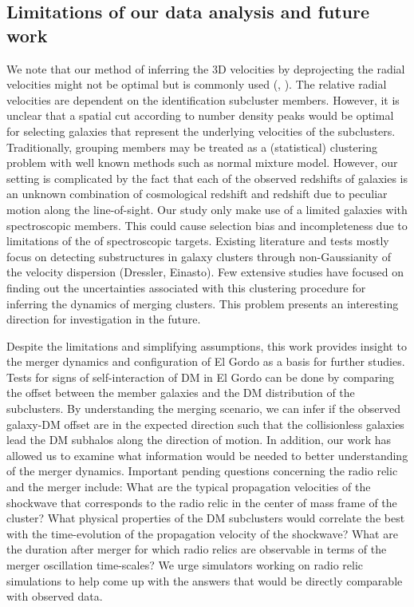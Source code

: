 \subsection{Limitations of our data analysis and future work} 
We note that our method of inferring the 3D velocities by deprojecting the
radial velocities might not be optimal but is commonly used (,
\citealt{Dawson12}). The relative
radial velocities are dependent on the identification subcluster members.
However, it is unclear that a spatial
cut according to number density peaks would be optimal for selecting
galaxies that represent the underlying velocities of the subclusters. Traditionally, grouping members
may be treated as a (statistical) clustering problem with well known
methods such as normal mixture model. However, our setting is complicated
by the fact that each of the observed redshifts of galaxies is an unknown combination of cosmological redshift
and redshift due to peculiar motion along the line-of-sight. Our study
only make use of a limited galaxies with spectroscopic members. This could
cause selection bias and incompleteness due to limitations of the 
of spectroscopic targets. Existing
literature and tests mostly focus on detecting substructures in galaxy
clusters through non-Gaussianity of the velocity dispersion (Dressler,
Einasto). Few extensive studies have focused on finding out the uncertainties
associated with this clustering procedure for inferring the dynamics of
merging clusters. This problem presents an interesting direction for investigation in the future.   
 
Despite the limitations and simplifying assumptions, this work provides
insight to the merger dynamics and configuration of El Gordo as a basis for further studies.
Tests for signs of self-interaction of DM in El Gordo  can be done
by comparing the offset between the member galaxies and the
DM distribution of the subclusters. By understanding the merging scenario,
we can infer if the observed galaxy-DM offset are in the expected
direction such that the collisionless galaxies lead the DM subhalos along
the direction of motion. In addition, our work has allowed us to examine
what information would be needed to better understanding of the merger
dynamics. Important pending questions concerning the radio relic and the
merger  include:  What are the typical propagation velocities of the shockwave that
corresponds to the radio relic in the	center of mass frame of the cluster?
What physical properties of the DM subclusters would correlate the best with the
time-evolution of the propagation velocity of the shockwave?  What are the duration
after merger for which radio relics are observable in terms of the merger
oscillation time-scales? We urge simulators working on radio relic
simulations to help come up with the answers that would be directly
comparable with observed data. \par 

